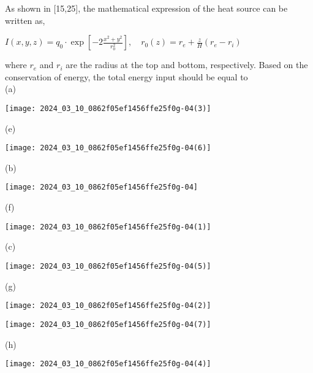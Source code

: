 \documentclass[10pt]{article}
\begin{document}
As shown in [15,25], the mathematical expression of the heat source can be written as,

$I(x, y, z)=q_{0} \cdot \exp \left[-2 \frac{x^{2}+y^{2}}{r_{0}^{2}}\right], \quad r_{0}(z)=r_{e}+\frac{z}{H}\left(r_{e}-r_{i}\right)$

where $r_{e}$ and $r_{i}$ are the radius at the top and bottom, respectively. Based on the conservation of energy, the total energy input should be equal to\\
(a)

\begin{center}
\texttt{[image: 2024\_03\_10\_0862f05ef1456ffe25f0g-04(3)]}
\end{center}

(e)

\begin{center}
\texttt{[image: 2024\_03\_10\_0862f05ef1456ffe25f0g-04(6)]}
\end{center}

(b)

\begin{center}
\texttt{[image: 2024\_03\_10\_0862f05ef1456ffe25f0g-04]}
\end{center}

(f)

\begin{center}
\texttt{[image: 2024\_03\_10\_0862f05ef1456ffe25f0g-04(1)]}
\end{center}

(c)

\begin{center}
\texttt{[image: 2024\_03\_10\_0862f05ef1456ffe25f0g-04(5)]}
\end{center}

(g)

\begin{center}
\texttt{[image: 2024\_03\_10\_0862f05ef1456ffe25f0g-04(2)]}
\end{center}

\begin{center}
\texttt{[image: 2024\_03\_10\_0862f05ef1456ffe25f0g-04(7)]}
\end{center}

(h)

\begin{center}
\texttt{[image: 2024\_03\_10\_0862f05ef1456ffe25f0g-04(4)]}
\end{center}
\end{document}

